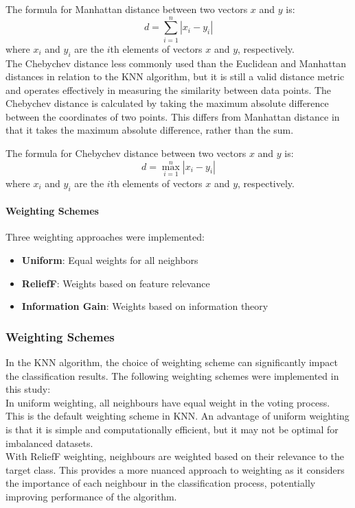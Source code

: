 The formula for Manhattan distance between two vectors \(x\) and \(y\) is:
\[ d = \sum_{i=1}^{n} |x_i - y_i| \]
where \(x_i\) and \(y_i\) are the \(i\)th elements of vectors \(x\) and \(y\), respectively.\\

The Chebychev distance less commonly used than the Euclidean and Manhattan distances
in relation to the KNN algorithm, but it is still a valid distance metric and operates effectively in measuring the similarity between data points.
The Chebychev distance is calculated by taking the maximum absolute difference between the coordinates of two points. This differs from Manhattan distance
in that it takes the maximum absolute difference, rather than the sum.

The formula for Chebychev distance between two vectors \(x\) and \(y\) is:
\[ d = \max_{i=1}^{n} |x_i - y_i| \]
where \(x_i\) and \(y_i\) are the \(i\)th elements of vectors \(x\) and \(y\), respectively.\\

\paragraph{Weighting Schemes}
Three weighting approaches were implemented:
\begin{itemize}
    \item \textbf{Uniform}: Equal weights for all neighbors
    \item \textbf{ReliefF}: Weights based on feature relevance
    \item \textbf{Information Gain}: Weights based on information theory
\end{itemize}


\subsubsection*{Weighting Schemes}
In the KNN algorithm, the choice of weighting scheme can significantly impact the classification results.
The following weighting schemes were implemented in this study:\\

In uniform weighting, all neighbours have equal weight in the voting process.
This is the default weighting scheme in KNN.
An advantage of uniform weighting is that it is simple and computationally efficient, but it may not be optimal for imbalanced datasets.\\

With ReliefF weighting, neighbours are weighted based on their relevance to the target class.
This provides a more nuanced approach to weighting as it considers the importance of each neighbour in the classification process, potentially
improving performance of the algorithm.\\

